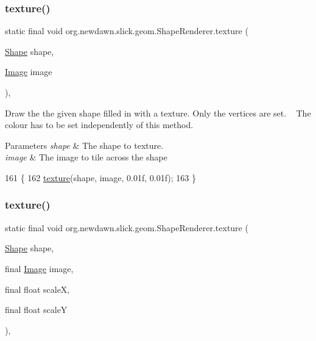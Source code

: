 \subsubsection{\texorpdfstring{texture()}{texture()}\hspace{0.1cm}{\footnotesize\ttfamily [1/4]}}
{\footnotesize\ttfamily static final void org.\+newdawn.\+slick.\+geom.\+Shape\+Renderer.\+texture (\begin{DoxyParamCaption}\item[{\mbox{\hyperlink{classorg_1_1newdawn_1_1slick_1_1geom_1_1_shape}{Shape}}}]{shape,  }\item[{\mbox{\hyperlink{classorg_1_1newdawn_1_1slick_1_1_image}{Image}}}]{image }\end{DoxyParamCaption})\hspace{0.3cm}{\ttfamily [inline]}, {\ttfamily [static]}}

Draw the the given shape filled in with a texture. Only the vertices are set. ~\newline
The colour has to be set independently of this method.


\begin{DoxyParams}{Parameters}
{\em shape} & The shape to texture. \\
\hline
{\em image} & The image to tile across the shape \\
\hline
\end{DoxyParams}

\begin{DoxyCode}
161                                                                \{
162         \mbox{\hyperlink{classorg_1_1newdawn_1_1slick_1_1geom_1_1_shape_renderer_ad2056c37d2e8613c99ee10c3c3ea5e96}{texture}}(shape, image, 0.01f, 0.01f);
163     \}
\end{DoxyCode}
\mbox{\label{classorg_1_1newdawn_1_1slick_1_1geom_1_1_shape_renderer_ae6467e2621a90c989ab6e9762914307d}} 
\subsubsection{\texorpdfstring{texture()}{texture()}\hspace{0.1cm}{\footnotesize\ttfamily [2/4]}}
{\footnotesize\ttfamily static final void org.\+newdawn.\+slick.\+geom.\+Shape\+Renderer.\+texture (\begin{DoxyParamCaption}\item[{\mbox{\hyperlink{classorg_1_1newdawn_1_1slick_1_1geom_1_1_shape}{Shape}}}]{shape,  }\item[{final \mbox{\hyperlink{classorg_1_1newdawn_1_1slick_1_1_image}{Image}}}]{image,  }\item[{final float}]{scaleX,  }\item[{final float}]{scaleY }\end{DoxyParamCaption})\hspace{0.3cm}{\ttfamily [inline]}, {\ttfamily [static]}}

